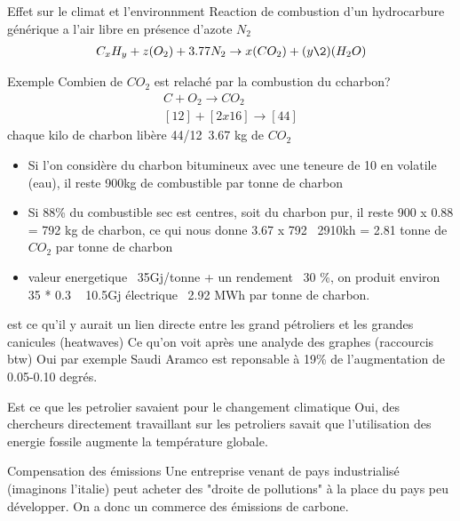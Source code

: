 \begin{parag}{Effet sur le climat et l'environnment}
    Reaction de combustion d'un hydrocarbure générique a l'air libre en présence d'azote $N_2$
    \begin{align*} C_xH_y + z(O_2) + 3.77N_2 \to x(CO_2) + (y\2)(H_2O) \end{align*}
    \begin{subparag}{Exemple}
        Combien de $CO_2$ est relaché par la combustion du ccharbon?
	\begin{align*} C + O_2 \to CO_2 \\
	[12] +  [2 x 16] \to [44]\end{align*}
	chaque kilo de charbon libère 44/12~3.67 kg de $CO_2$
	\begin{itemize}
		\item Si l'on considère du charbon bitumineux avec une teneure de 10 en volatile (eau), il reste 900kg de combustible par tonne de charbon
		\item Si 88\% du combustible sec est centres, soit du charbon pur, il reste 900 x 0.88 = 792 kg de charbon, ce qui nous donne 3.67 x 792 ~2910kh = 2.81 tonne de $CO_2$ par tonne de charbon
		\item valeur energetique ~35Gj/tonne + un rendement ~30 \%, on produit environ 35 * 0.3 ~ 10.5Gj électrique ~2.92 MWh par tonne de charbon.
	\end{itemize}
	
    \end{subparag}
\end{parag}
\begin{parag}{est ce qu'il y aurait un lien directe entre les grand pétroliers et les grandes canicules (heatwaves)}
	Ce qu'on voit après une analyde des graphes (raccourcis btw) Oui par exemple Saudi Aramco est reponsable à 19\% de l'augmentation de 0.05-0.10 degrés.  
    \begin{subparag}{Est ce que les petrolier savaient pour le changement climatique}
        Oui, des chercheurs directement travaillant sur les petroliers savait que l'utilisation des energie fossile augmente la température globale.
    \end{subparag}
\end{parag}

\begin{parag}{Compensation des émissions}
    Une entreprise venant de pays industrialisé (imaginons l'italie) peut acheter des "droite de pollutions" à la place du pays peu développer. On a donc un commerce des émissions de carbone.
\end{parag}

